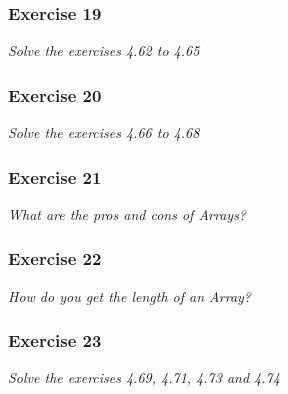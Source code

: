 \subsubsection*{Exercise 19}
\textit{Solve the exercises 4.62 to 4.65}\\

\subsubsection*{Exercise 20}
\textit{Solve the exercises 4.66 to 4.68}\\

\subsubsection*{Exercise 21}
\textit{What are the pros and cons of Arrays?}\\

\subsubsection*{Exercise 22}
\textit{How do you get the length of an Array?}\\

\subsubsection*{Exercise 23}
\textit{Solve the exercises 4.69, 4.71, 4.73 and 4.74}\\


